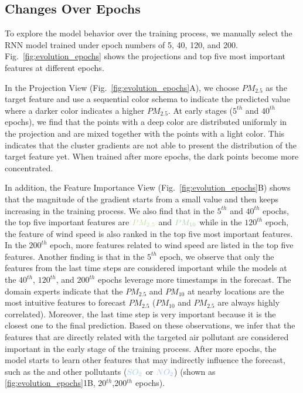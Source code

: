 \subsection{Changes Over Epochs}
To explore the model behavior over the training process, we manually select the RNN model trained under epoch numbers of 5, 40, 120, and 200. Fig.~\ref{fig:evolution_epochs} shows the projections and top five most important features at different epochs.

In the Projection View (Fig.~\ref{fig:evolution_epochs}A), we choose $PM_{2.5}$ as the target feature and use a sequential color schema to indicate the predicted value where a darker color indicates a higher $PM_{2.5}$. 
At early stages ($5^{th}$ and $40^{th}$ epochs), we find that the points with a deep color are distributed uniformly in the projection and are mixed together with the points with a light color. 
This indicates that the cluster gradients are not able to present the distribution of the target feature yet.
When trained after more epochs, the dark points become more concentrated. 

In addition, the Feature Importance View (Fig.~\ref{fig:evolution_epochs}B) shows that the magnitude of the gradient starts from a small value and then keeps increasing in the training process. 
We also find that in the $5^{th}$ and $40^{th}$ epochs, the top five important features are $\color{PM25Color}{PM_{2.5}}$ and $\color{PM10Color}{PM_{10}}$ while in the $120^{th}$ epoch, the feature of wind speed is also ranked in the top five most important features. 
In the $200^{th}$ epoch, more features related to wind speed are listed in the top five features.
Another finding is that in the $5^{th}$ epoch, we observe that only the features from the last time steps are considered important while the models at the $40^{th}$, $120^{th}$, and $200^{th}$ epochs leverage more timestamps in the forecast.  
The domain experts indicate that the $PM_{2.5}$ and $PM_{10}$ at nearby locations are the most intuitive features to forecast $PM_{2.5}$ ($PM_{10}$ and $PM_{2.5}$ are always highly correlated).
Moreover, the last time step is very important because it is the closest one to the final prediction. 
Based on these observations, we infer that the features that are directly related with the targeted air pollutant are considered important in the early stage of the training process.
After more epochs, the model starts to learn other features that may indirectly influence the forecast, such as the \textit{\color{WINDColor}{Wind Speed}} and other pollutants ($\color{SO2Color}{SO_2}$ or $\color{NO2Color}{NO_2}$) (shown as \ref{fig:evolution_epochs}1B, 20$^{th}$,200$^{th}$ epochs). 

